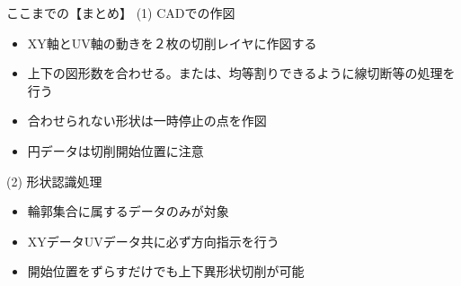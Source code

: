 \vspace*{3zh}
\begin{itembox}[l]{ここまでの【まとめ】}
(1) CADでの作図
\begin{itemize}
\item XY軸とUV軸の動きを２枚の切削レイヤに作図する
\item 上下の図形数を合わせる。または、均等割りできるように線切断等の処理を行う
\item 合わせられない形状は一時停止の点を作図
\item 円データは切削開始位置に注意
\end{itemize}
(2) 形状認識処理
\begin{itemize}
\item 輪郭集合に属するデータのみが対象
\item XYデータUVデータ共に必ず方向指示を行う
\item 開始位置をずらすだけでも上下異形状切削が可能
\end{itemize}
\end{itembox}
